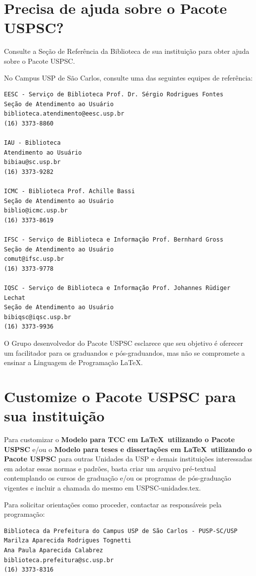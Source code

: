 \section{Precisa de ajuda sobre o Pacote USPSC?}
Consulte a Seção de Referência da Biblioteca de sua instituição para obter ajuda sobre o Pacote USPSC.

No Campus USP de São Carlos, consulte uma das seguintes equipes de referência:
\begin{verbatim}
EESC - Serviço de Biblioteca Prof. Dr. Sérgio Rodrigues Fontes 
Seção de Atendimento ao Usuário
biblioteca.atendimento@eesc.usp.br
(16) 3373-8860

IAU - Biblioteca
Atendimento ao Usuário
bibiau@sc.usp.br
(16) 3373-9282

ICMC - Biblioteca Prof. Achille Bassi
Seção de Atendimento ao Usuário
biblio@icmc.usp.br
(16) 3373-8619

IFSC - Serviço de Biblioteca e Informação Prof. Bernhard Gross
Seção de Atendimento ao Usuário
comut@ifsc.usp.br
(16) 3373-9778

IQSC - Serviço de Biblioteca e Informação Prof. Johannes Rüdiger Lechat
Seção de Atendimento ao Usuário
bibiqsc@iqsc.usp.br
(16) 3373-9936
\end{verbatim}


O Grupo desenvolvedor do Pacote USPSC esclarece que seu objetivo é oferecer um facilitador para os graduandos e pós-graduandos, mas não se compromete a ensinar a Linguagem de Programação \LaTeX .  

\section{Customize o Pacote USPSC para sua instituição}

Para customizar o \textbf{Modelo para TCC em \LaTeX\ utilizando o Pacote USPSC} e/ou o \textbf{Modelo para teses e dissertações em \LaTeX\ utilizando o Pacote USPSC} para outras Unidades da USP e demais instituições interessadas em adotar essas normas e padrões, basta criar um arquivo pré-textual contemplando os cursos de graduação e/ou os programas de pós-graduação vigentes e incluir a chamada do mesmo em USPSC-unidades.tex.

Para solicitar orientações como proceder, contactar as responsáveis pela programação:

\begin{verbatim}
Biblioteca da Prefeitura do Campus USP de São Carlos - PUSP-SC/USP
Marilza Aparecida Rodrigues Tognetti
Ana Paula Aparecida Calabrez
biblioteca.prefeitura@sc.usp.br
(16) 3373-8316
\end{verbatim}





